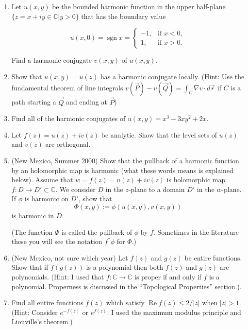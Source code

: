 \documentclass[a4paper,10pt]{article}
\newcommand{\CC}{\mathbb{C}}
\renewcommand{\Re}{\operatorname{Re}}
\begin{document}
\begin{enumerate}
	\item  Let $u(x,y)$ be the bounded harmonic function in the upper half-plane $\{z=x+iy\in \mathbb{C}|y>0\}$ that has the boundary value
	
	\[u(x,0)=\operatorname{sgn} x=\begin{cases} -1, & \text{if } x<0, \\ 1, & \text{if } x>0. \end{cases}\]
	
	Find a harmonic conjugate $v(x,y)$ of $u(x,y)$.
	
	\item  Show that $u(x,y) = u(z)$ has a harmonic conjugate locally. (Hint: Use the fundamental theorem of line integrals $v(\vec{P}) -v(\vec{Q})  = \int_{C} \nabla v \cdot d\vec{r}$ if $C$ is a path starting a $\vec{Q}$ and ending at $\vec{P}$)

	\item 
	Find all of the harmonic conjugates of $u(x,y) = x^3 - 3xy^2 + 2x$. 
	
	\item Let $f(z) = u(z) + i v(z)$ be analytic. 
	Show that the level sets of $u(z)$ and $v(z)$ are orthogonal.
	
	\item (New Mexico, Summer 2000)
	Show that the pullback of a harmonic function by an holomorphic map is harmonic (what these words means is explained below).
	Assume that $w = f(z) = u(z)+iv(z)$ is holomorphic map $f:D \to D' \subset \CC$. We consider $D$ in the $z$-plane to a domain $D'$ in the $w$-plane. 
	If $\phi$ is harmonic on $D'$, show that 
	$$ \Phi(x,y) := \phi(u(x,y),v(x,y))$$
	is harmonic in $D$. 
	
	(The function $\Phi$ is called the pullback of $\phi$ by $f$. Sometimes in the literature these you will see the notation $f^*\phi$ for $\Phi$.)
		
	\item (New Mexico, not sure which year) 
	Let $f(z)$ and $g(z)$ be entire functions. 
	Show that if $f(g(z))$ is a polynomial then both $f(z)$ and $g(z)$ are polynomials.
	(Hint: I used that $f:\CC\to\CC$ is proper if and only if $f$ is a polynomial.  Properness is discussed in the ``Topological Properties'' section.).
	
	\item Find all entire functions $f(z)$ which satisfy $\Re f(z) \leq 2/\vert z \vert$ when $\vert z \vert > 1$. (Hint: Consider $e^{-f(z)}$ or $e^{f(z)}$. I used the maximum modulus principle and Liouville's theorem.)
	

\end{enumerate}
\end{document}
